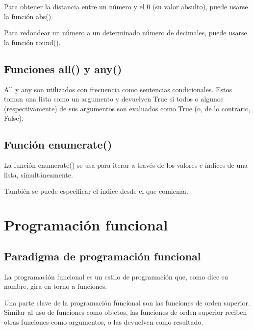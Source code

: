 \documentclass{report}
\begin{document}

Para obtener la distancia entre un número y el 0 (su valor absulto), puede usarse la función abs().


Para redondear un número a un determinado número de decimales, puede usarse la función round().


\section{Funciones all() y any()}

All y any son utilizados con frecuencia como sentencias condicionales. Estos toman una lista como un argumento y devuelven True si todos o algunos (respectivamente) de sus argumentos son evaluados como True (o, de lo contrario, False).



\section{Función enumerate()}

La función enumerate() se usa para iterar a través de los valores e índices de una lista, simultáneamente.


También se puede especificar el índice desde el que comienza.


\clearpage\chapter{Programación funcional}

\section{Paradigma de programación funcional}

La programación funcional es un estilo de programación que, como dice su nombre, gira en torno a funciones.\smallskip

Una parte clave de la programación funcional son las funciones de orden superior. Similar al uso de funciones como objetos, las funciones de orden superior reciben otras funciones como argumentos, o las devuelven como resultado.
\end{document}
